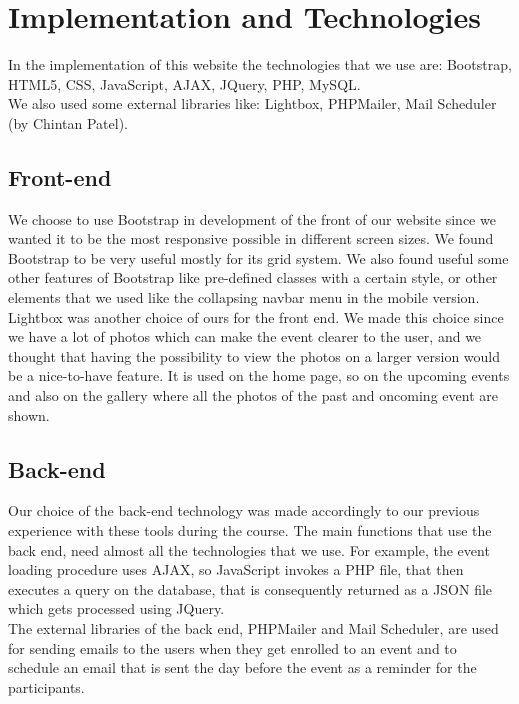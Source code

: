 \documentclass[a4paper]{article}
\begin{document}
	\section{Implementation and Technologies}	
	In the implementation of this website the technologies that we use are: Bootstrap, HTML5, CSS, JavaScript, AJAX, JQuery, PHP, MySQL.\\
	We also used some external libraries like: Lightbox, PHPMailer, Mail Scheduler (by Chintan Patel).
	\subsection{Front-end}
	We choose to use Bootstrap in development of the front of our website since we wanted it to be the most responsive possible in different screen sizes. We found Bootstrap to be very useful mostly for its grid system. We also found useful some other features of Bootstrap like pre-defined classes with a certain style, or other elements that we used like the collapsing navbar menu in the mobile version.\\
	Lightbox was another choice of ours for the front end. We made this choice since we have a lot of photos which can make the event clearer to the user, and we thought that having the possibility to view the photos on a larger version would be a nice-to-have feature. It is used on the home page, so on the upcoming events and also on the gallery where all the photos of the past and oncoming event are shown.\\
	\subsection{Back-end}
	Our choice of the back-end technology was made accordingly to our previous experience with these tools during the course. The main functions that use the back end, need almost all the technologies that we use. For example, the event loading procedure uses AJAX, so JavaScript invokes a PHP file, that then executes a query on the database, that is consequently returned as a JSON file which gets processed using JQuery. \\ 
	The external libraries of the back end, PHPMailer and Mail Scheduler, are used for sending emails to the users when they get enrolled to an event and to schedule an email that is sent the day before the event as a reminder for the participants.
\end{document}
